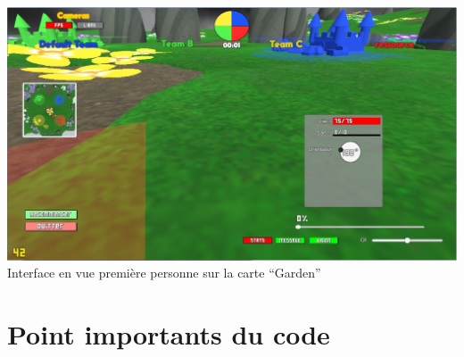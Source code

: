\documentclass{report}
\begin{document}
\paragraph{}

\paragraph{}
\begin{adjustwidth}{-3em}{}
\includegraphics[scale=0.5]{DATA/enjeufps.png}
 {Interface en vue première personne sur la carte “Garden”}
\end{adjustwidth}
\paragraph{}

\section{Point importants du code}
\end{document}
